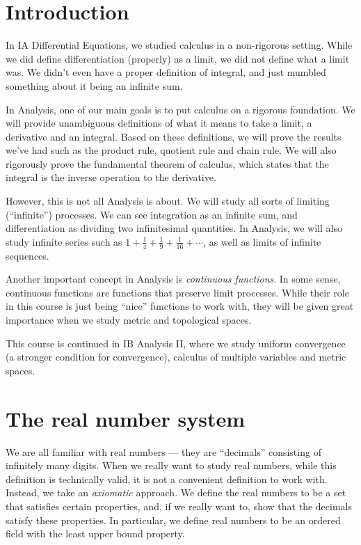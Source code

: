 \documentclass[a4paper]{article}
\begin{document}
\tableofcontents

\setcounter{section}{-1}
\section{Introduction}
In IA Differential Equations, we studied calculus in a non-rigorous setting. While we did define differentiation (properly) as a limit, we did not define what a limit was. We didn't even have a proper definition of integral, and just mumbled something about it being an infinite sum.

In Analysis, one of our main goals is to put calculus on a rigorous foundation. We will provide unambiguous definitions of what it means to take a limit, a derivative and an integral. Based on these definitions, we will prove the results we've had such as the product rule, quotient rule and chain rule. We will also rigorously prove the fundamental theorem of calculus, which states that the integral is the inverse operation to the derivative.

However, this is not all Analysis is about. We will study all sorts of limiting (``infinite'') processes. We can see integration as an infinite sum, and differentiation as dividing two infinitesimal quantities. In Analysis, we will also study infinite series such as $1 + \frac{1}{4} + \frac{1}{9} + \frac{1}{16} + \cdots$, as well as limits of infinite sequences.

Another important concept in Analysis is \emph{continuous functions}. In some sense, continuous functions are functions that preserve limit processes. While their role in this course is just being ``nice'' functions to work with, they will be given great importance when we study metric and topological spaces.

This course is continued in IB Analysis II, where we study uniform convergence (a stronger condition for convergence), calculus of multiple variables and metric spaces.

\section{The real number system}
We are all familiar with real numbers --- they are ``decimals'' consisting of infinitely many digits. When we really want to study real numbers, while this definition is technically valid, it is not a convenient definition to work with. Instead, we take an \emph{axiomatic} approach. We define the real numbers to be a set that satisfies certain properties, and, if we really want to, show that the decimals satisfy these properties. In particular, we define real numbers to be an ordered field with the least upper bound property.
\end{document}
